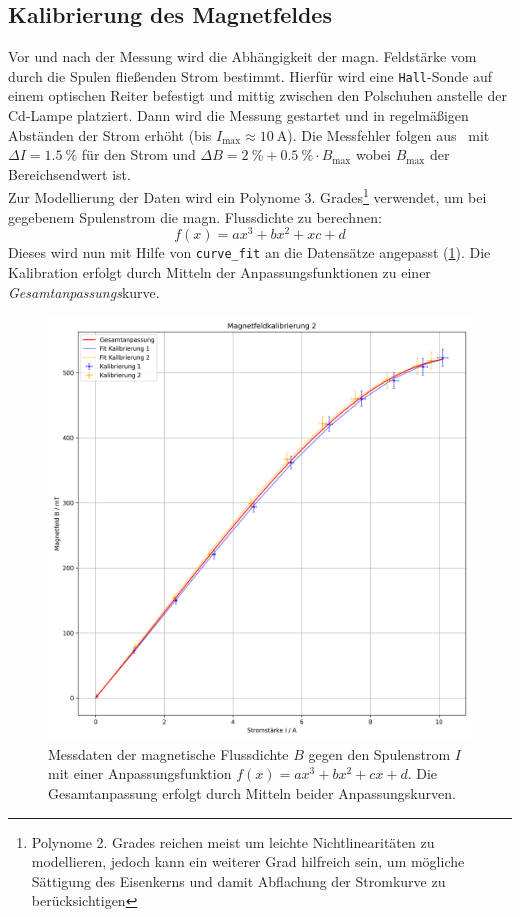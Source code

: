 \subsection{Kalibrierung des Magnetfeldes}\label{sec:kal_magnetfled}
Vor und nach der Messung wird die Abhängigkeit der magn. Feldstärke vom durch die Spulen fließenden Strom bestimmt. Hierfür wird eine \texttt{Hall}-Sonde auf einem optischen Reiter befestigt und mittig zwischen den Polschuhen anstelle der Cd-Lampe platziert. Dann wird die Messung gestartet und in regelmäßigen Abständen der Strom erhöht (bis $I_{\text{max}}\approx \SI{10}{\ampere}$). Die Messfehler folgen aus~\cite{LD} mit $\Delta I = \SI{1.5}{\percent}$ für den Strom und $\Delta B = \SI{2}{\percent} + \SI{0.5}{\percent}\cdot B_{\text{max}}$ wobei $B_{\text{max}}$ der Bereichsendwert ist.\\
Zur Modellierung der Daten wird ein Polynome 3. Grades\footnote{Polynome 2. Grades reichen meist um leichte Nichtlinearitäten zu modellieren, jedoch kann ein weiterer Grad hilfreich sein, um mögliche Sättigung des Eisenkerns und damit Abflachung der Stromkurve zu berücksichtigen} verwendet, um bei gegebenem Spulenstrom die magn. Flussdichte zu berechnen:
\begin{equation*}
    f(x) = ax^3 + bx^2+xc+d
\end{equation*}
Dieses wird nun mit Hilfe von \texttt{curve\_fit} an die Datensätze angepasst (\cref{fig:magnetfeldkali_ges}). Die Kalibration erfolgt durch Mitteln der Anpassungsfunktionen zu einer \textit{Gesamtanpassungs}kurve.
\begin{figure}[h]
    \centering
    \includegraphics[width=0.8\linewidth]{plots/zeeman_pltKalibrierung_gesamt.png}
    \caption{Messdaten der magnetische Flussdichte $B$ gegen den Spulenstrom $I$ mit einer Anpassungsfunktion $ f(x)=ax^3+bx^2+cx+d $. Die Gesamtanpassung erfolgt durch Mitteln beider Anpassungskurven.}\label{fig:magnetfeldkali_ges}
\end{figure}
